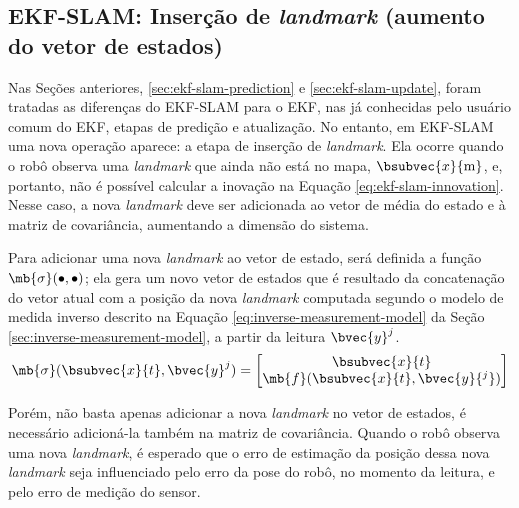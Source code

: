 \subsection{EKF-SLAM: Inserção de \textit{landmark} (aumento do vetor de estados)}
\label{sec:ekf-slam-landmark-insertion}
Nas Seções anteriores, \ref{sec:ekf-slam-prediction} e \ref{sec:ekf-slam-update}, foram tratadas as diferenças 
do EKF-SLAM para o EKF, nas já conhecidas pelo usuário comum do EKF, etapas de predição e atualização. No entanto, em EKF-SLAM uma nova operação aparece: a etapa de inserção de \textit{landmark}. Ela ocorre quando o robô observa uma \textit{landmark} que ainda não está no mapa, $\bsubvec{x}{\mathrm{m}}$, e, portanto, não é possível calcular a inovação na Equação \ref{eq:ekf-slam-innovation}. Nesse caso, a nova \textit{landmark} deve ser adicionada ao vetor de média do estado e à matriz de covariância, aumentando a dimensão do sistema.

Para adicionar uma nova \textit{landmark} ao vetor de estado, será definida 
a função $\mb{\sigma}(\bullet, \bullet)$; ela gera um novo vetor de estados 
que é resultado da concatenação do vetor atual com a posição da nova 
\textit{landmark} computada segundo o modelo de medida inverso descrito na Equação \ref{eq:inverse-measurement-model} da Seção \ref{sec:inverse-measurement-model}, a partir da leitura $\bvec{y}^j$.
\begin{equation}
      \mb{\sigma}(\bsubvec{x}{t}, \bvec{y}^j) = \begin{bmatrix}
        \bsubvec{x}{t} \\
        \mb{f}(\bsubvec{x}{t}, \bvec{y}{^j})
      \end{bmatrix}
\end{equation}

Porém, não basta apenas adicionar a nova \textit{landmark} no vetor de estados, é necessário adicioná-la também na matriz de covariância. Quando 
o robô observa uma nova \textit{landmark}, é esperado que o erro de estimação 
da posição dessa nova \textit{landmark} seja influenciado pelo erro da 
pose do robô, no momento da leitura, e pelo erro de medição do sensor. 

